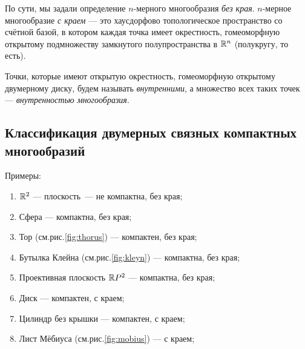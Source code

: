 \begin{remark}
    По сути, мы задали определение $n$-мерного многообразия \textit{без края}. $n$-мерное многообразие \textit{с краем} — это хаусдорфово топологическое пространство со счётной базой, в котором каждая точка имеет окрестность, гомеоморфную открытому подмножеству замкнутого полупространства в $\mathbb{R}^n$ (полукругу, то есть).
\end{remark}

\begin{remark}
    Точки, которые имеют открытую окрестность, гомеоморфную открытому двумерному диску, будем называть \textit{внутренними}, а множество всех таких точек — \textit{внутренностью многообразия}.
\end{remark}

\subsection{Классификация двумерных связных компактных многообразий}

Примеры:
\begin{enumerate}
    \item $\mathbb{R}^2$ — плоскость — не компактна, без края;
    \item Сфера — компактна, без края;
    \item Тор (см.рис.\ref{fig:thorus}) — компактен, без края;
    \item Бутылка Клейна (см.рис.\ref{fig:kleyn}) — компактна, без края;
    \item Проективная плоскость $\mathbb{R} P^2$ — компактна, без края;
    \item Диск — компактен, с краем;
    \item Цилиндр без крышки — компактен, с краем;
    \item Лист Мёбиуса (см.рис.\ref{fig:mobius}) — с краем;
\end{enumerate}

